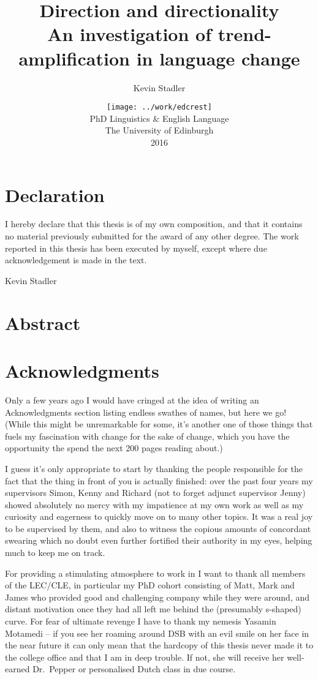\documentclass[oneside]{book}
\author{Kevin Stadler}
\title{Direction and directionality\\\large An investigation of trend-amplification in language change}
\date{\vfill\texttt{[image: ../work/edcrest]}\\
\vspace{1em}
PhD Linguistics \& English Language\\
The University of Edinburgh\\
2016}
\begin{document}
\frontmatter

\maketitle

\chapter*{Declaration}
I hereby declare that this thesis is of my own composition, and that it contains no material previously submitted for the award of any other degree. The work reported in this thesis has been executed by myself, except where due
acknowledgement is made in the text.

\vspace{1in}\hfill Kevin Stadler

\chapter*{Abstract}


\chapter*{Acknowledgments}

Only a few years ago I would have cringed at the idea of writing an Acknowledgments section listing endless swathes of names, but here we go! (While this might be unremarkable for some, it's another one of those things that fuels my fascination with change for the sake of change, which you have the opportunity the spend the next 200 pages reading about.)

I guess it's only appropriate to start by thanking the people responsible for the fact that the thing in front of you is actually finished: over the past four years my supervisors Simon, Kenny and Richard (not to forget adjunct supervisor Jenny) showed absolutely no mercy with my impatience at my own work as well as my curiosity and eagerness to quickly move on to many other topics. It was a real joy to be supervised by them, and also to witness the copious amounts of concordant swearing which no doubt even further fortified their authority in my eyes, helping much to keep me on track.

For providing a stimulating atmosphere to work in I want to thank all members of the LEC/CLE, in particular my PhD cohort consisting of Matt, Mark and James who provided good and challenging company while they were around, and distant motivation once they had all left me behind the (presumably s-shaped) curve.
For fear of ultimate revenge I have to thank my nemesis Yasamin Motamedi -- if you see her roaming around DSB with an evil smile on her face in the near future it can only mean that the hardcopy of this thesis never made it to the college office and that I am in deep trouble. If not, she will receive her well-earned Dr.~Pepper or personalised Dutch class in due course.
\end{document}
